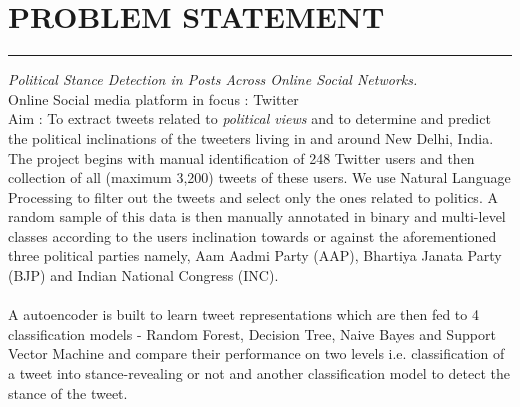 \documentclass[a4paper,11pt]{article}
\begin{document}
\section{PROBLEM STATEMENT}
\hrule
\vspace*{5mm}
\textit{Political Stance Detection in Posts Across Online Social Networks.}\medskip\\
Online Social media platform in focus : Twitter\\
Aim : To extract tweets related to \textit{political views} and to determine and predict the political inclinations of the tweeters living in and around New Delhi, India.
\medskip\\
The project begins with manual identification of 248 Twitter users and then collection of all (maximum 3,200) tweets of these users. We use Natural Language Processing to filter out the tweets and select only the ones related to politics. A random sample of this data is then manually annotated in binary and multi-level classes according to the users inclination towards or against the aforementioned three political parties namely, Aam Aadmi Party (AAP), Bhartiya Janata Party (BJP) and Indian National Congress (INC).\\
\medskip\\
A autoencoder is built to learn tweet representations which are then fed to 4 classification models - Random Forest, Decision Tree, Naive Bayes and Support Vector Machine and compare their performance on two levels i.e. classification of a tweet into stance-revealing or not and another classification model to detect the stance of the tweet.

\newpage
\end{document}
